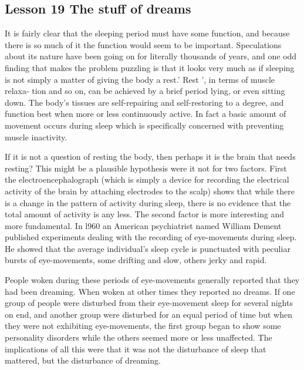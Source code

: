 \documentclass[kindlepaper]{BHCexam4kindle}
\begin{document}
\subsection{Lesson 19
The stuff of dreams}
\par
It is fairly clear that the sleeping period must have some function, and because
there is so much of it the function would seem to be important. Speculations
about its nature have been going on for literally thousands of years, and one odd
finding that makes the problem puzzling is that it looks very much as if sleeping
is not simply a matter of giving the body a rest.' Rest ', in terms of muscle relaxa-
tion and so on, can be achieved by a brief period lying, or even sitting down. The
body's tissues are self-repairing and self-restoring to a degree, and function best
when more or less continuously active. In fact a basic amount of movement occurs
during sleep which is specifically concerned with preventing muscle inactivity.
\par
If it is not a question of resting the body, then perhaps it is the brain that needs
resting? This might be a plausible hypothesis were it not for two factors. First the
electroencephalograph (which is simply a device for recording the electrical
activity of the brain by attaching electrodes to the scalp) shows that while there
is a change in the pattern of activity during sleep, there is no evidence that the
total amount of activity is any less. The second factor is more interesting and
more fundamental. In l960 an American psychiatrist named William Dement
published experiments dealing with the recording of eye-movements during
sleep. He showed that the average individual's sleep cycle is punctuated with
peculiar bursts of eye-movements, some drifting and slow, others jerky and rapid.
\par
People woken during these periods of eye-movements generally reported that
they had been dreaming. When woken at other times they reported no dreams. If
one group of people were disturbed from their eye-movement sleep for several
nights on end, and another group were disturbed for an equal period of time but
when they were not exhibiting eye-movements, the first group began to show
some personality disorders while the others seemed more or less unaffected. The
implications of all this were that it was not the disturbance of sleep that mattered,
but the disturbance of dreaming.
\clearpage
\end{document}
